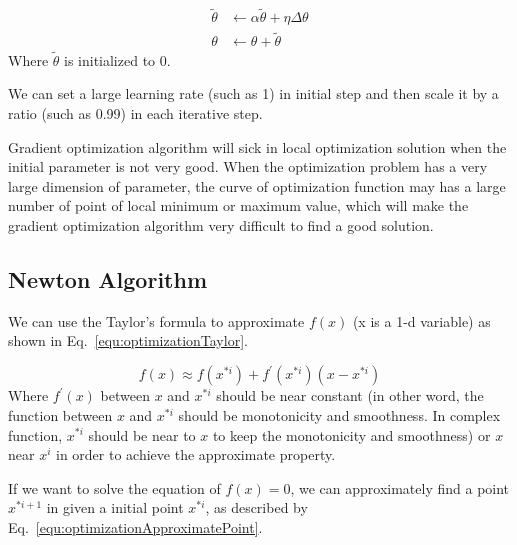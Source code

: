 \documentclass[runningheads,openany]{xhlPaper}
\begin{document}
\begin{equation}
\label{equ:optimizationGradientMomentLearningRate}
\begin{aligned}
\tilde \theta  &\leftarrow \alpha \tilde \theta  + \eta \Delta \theta \\
\theta  &\leftarrow \theta  + \tilde \theta 
\end{aligned}
\end{equation}
Where $\tilde \theta$ is initialized to 0.

We can set a large learning rate (such as 1) in initial step and then scale it by a ratio (such as 0.99) in each iterative step.

Gradient optimization algorithm will sick in local optimization solution when the initial parameter is not very good. When the optimization problem has a very large dimension of parameter, the curve of optimization function may has a large number of point of local minimum or maximum value, which will make the gradient optimization algorithm very difficult to find a good solution. 

\subsection{Newton Algorithm}
We can use the Taylor's formula to approximate $f\left(x\right)$ (x is a 1-d variable) as shown in Eq.~\ref{equ:optimizationTaylor}.

\begin{equation}
\label{equ:optimizationTaylor}
f\left( x \right) \approx f\left( {{x^{*i}}} \right) + {f^{'}}\left( {{x^{*i}}} \right)\left( {x - {x^{*i}}} \right)
\end{equation}
Where $f^{'}\left(x\right)$ between $x$ and $x^{*i}$ should be near constant (in other word, the function between $x$ and $x^{*i}$ should be monotonicity and smoothness. In complex function, $x^{*i}$ should be near to $x$ to keep the monotonicity and smoothness) or $x$ near $x^{i}$ in order to achieve the approximate property. 

If we want to solve the equation of $f\left(x\right) = 0$, we can approximately find a point $x^{*i + 1}$ in given a initial point $x^{*i}$, as described by Eq.~\ref{equ:optimizationApproximatePoint}.
\end{document}
